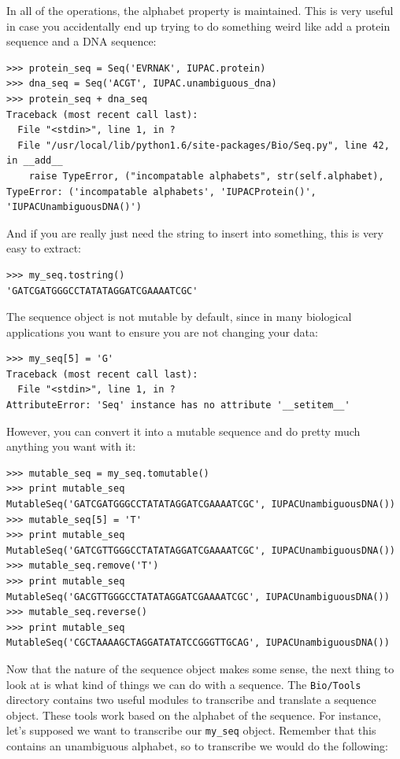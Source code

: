 \documentclass{report}
\begin{document}
In all of the operations, the alphabet property is maintained. This is very useful in case you accidentally end up trying to do something weird like add a protein sequence and a DNA sequence:

\begin{verbatim}
>>> protein_seq = Seq('EVRNAK', IUPAC.protein)
>>> dna_seq = Seq('ACGT', IUPAC.unambiguous_dna)
>>> protein_seq + dna_seq
Traceback (most recent call last):
  File "<stdin>", line 1, in ?
  File "/usr/local/lib/python1.6/site-packages/Bio/Seq.py", line 42, in __add__
    raise TypeError, ("incompatable alphabets", str(self.alphabet),
TypeError: ('incompatable alphabets', 'IUPACProtein()', 'IUPACUnambiguousDNA()')
\end{verbatim}


And if you are really just need the string to insert into something, this is very easy to extract:

\begin{verbatim}
>>> my_seq.tostring()
'GATCGATGGGCCTATATAGGATCGAAAATCGC'
\end{verbatim} 

The sequence object is not mutable by default, since in many biological applications you want to ensure you are not changing your data:

\begin{verbatim}
>>> my_seq[5] = 'G'
Traceback (most recent call last):
  File "<stdin>", line 1, in ?
AttributeError: 'Seq' instance has no attribute '__setitem__'
\end{verbatim}

However, you can convert it into a mutable sequence and do pretty much anything you want with it:

\begin{verbatim}
>>> mutable_seq = my_seq.tomutable()
>>> print mutable_seq
MutableSeq('GATCGATGGGCCTATATAGGATCGAAAATCGC', IUPACUnambiguousDNA())
>>> mutable_seq[5] = 'T'
>>> print mutable_seq
MutableSeq('GATCGTTGGGCCTATATAGGATCGAAAATCGC', IUPACUnambiguousDNA())
>>> mutable_seq.remove('T')
>>> print mutable_seq
MutableSeq('GACGTTGGGCCTATATAGGATCGAAAATCGC', IUPACUnambiguousDNA())
>>> mutable_seq.reverse()
>>> print mutable_seq
MutableSeq('CGCTAAAAGCTAGGATATATCCGGGTTGCAG', IUPACUnambiguousDNA())
\end{verbatim}

Now that the nature of the sequence object makes some sense, the next thing to look at is what kind of things we can do with a sequence. The \verb|Bio/Tools| directory contains two useful modules to transcribe and translate a sequence object. These tools work based on the alphabet of the sequence. For instance, let's supposed we want to transcribe our \verb|my_seq| object. Remember that this contains an unambiguous alphabet, so to transcribe we would do the following:
\end{document}
